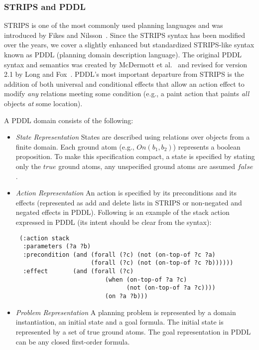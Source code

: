\subsubsection{STRIPS and PDDL}

STRIPS is one of the most commonly used planning languages and was
introduced by Fikes and Nilsson~\cite{fn:strips}.  Since the STRIPS
syntax has been modified over the years, we cover a slightly enhanced
but standardized STRIPS-like syntax known as PDDL (planning domain
description language).  The original PDDL syntax and semantics was
created by McDermott et al.~\cite{pddl} and revised for version 2.1
by Long and Fox~\cite{pddl21}.  PDDL's most important departure from
STRIPS is the addition of both universal and conditional effects that
allow an action effect to modify \emph{any} relations meeting some
condition (e.g., a paint action that paints \emph{all} objects
\emph{at} some location).

A PDDL domain consists of the following:

\begin{itemize}

\item \emph{State Representation} 
States are described using
relations over objects from a finite domain.  Each ground atom
(e.g., $On(b_1,b_2)$) represents a boolean proposition.
To make this specification
compact, a state is specified by stating only the $true$ ground
atoms, any unspecified ground atoms are assumed $false$.

\item \emph{Action Representation}
An action is
specified by its preconditions
and its effects (represented as add and delete lists in STRIPS or
non-negated and negated effects in PDDL).  
Following is an example of the stack action expressed in PDDL (its
intent should be clear from the syntax):

\begin{verbatim}
 (:action stack
  :parameters (?a ?b)
  :precondition (and (forall (?c) (not (on-top-of ?c ?a)
                     (forall (?c) (not (on-top-of ?c ?b))))))
  :effect       (and (forall (?c) 
                         (when (on-top-of ?a ?c)
                               (not (on-top-of ?a ?c))))
                         (on ?a ?b))) 
\end{verbatim}

%
\item \emph{Problem Representation} A planning problem is represented by a 
domain instantiation, an initial state and a goal formula.  The
initial state is represented by a set of true ground
atoms.  The goal representation in PDDL can be
any closed first-order formula.  

\end{itemize}


